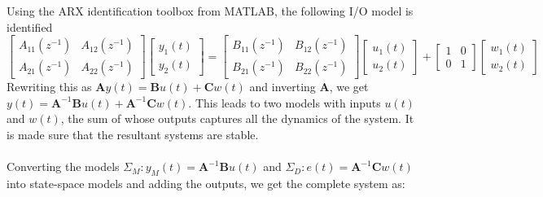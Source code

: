 \documentclass[a4paper]{article}
\begin{document}
Using the ARX identification toolbox from MATLAB, the following I/O model is identified
\begin{equation}
\begin{bmatrix}
A_{11}(z^{-1}) & A_{12}(z^{-1}) \\
A_{21}(z^{-1}) & A_{22}(z^{-1})
\end{bmatrix}
\begin{bmatrix}
y_1(t) \\ y_2(t)
\end{bmatrix} = 
\begin{bmatrix}
B_{11}(z^{-1}) & B_{12}(z^{-1}) \\
B_{21}(z^{-1}) & B_{22}(z^{-1})
\end{bmatrix}
\begin{bmatrix}
u_1(t) \\ u_2(t)
\end{bmatrix} +
\begin{bmatrix}
1 & 0 \\ 0 & 1
\end{bmatrix}
\begin{bmatrix}
w_1(t) \\ w_2(t)
\end{bmatrix}
\end{equation}
Rewriting this as $\textbf{A}y(t) = \textbf{B}u(t)+\textbf{C}w(t)$ and inverting \textbf{A}, we get $y(t) = \textbf{A}^{-1}\textbf{B}u(t) + \textbf{A}^{-1}\textbf{C}w(t)$. This leads to two models with inputs $u(t)$ and $w(t)$, the sum of whose outputs captures all the dynamics of the system. It is made sure that the resultant systems are stable.
\\ \\
Converting the models $\Sigma_M:y_M(t) = \textbf{A}^{-1}\textbf{B}u(t)$ and $\Sigma_D:e(t) = \textbf{A}^{-1}\textbf{C}w(t)$ into state-space models and adding the outputs, we get the complete system as:
\end{document}
